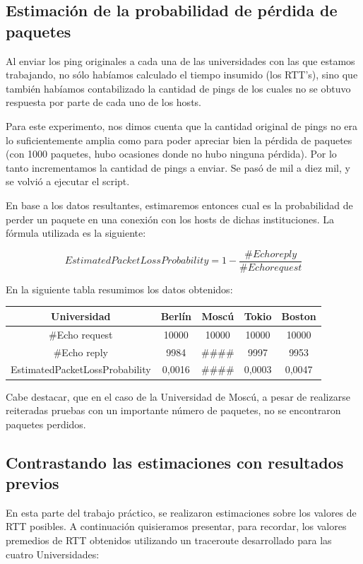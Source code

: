 \subsection{Estimación de la probabilidad de pérdida de paquetes}

Al enviar los ping originales a cada una de las universidades con las que estamos trabajando, no sólo habíamos calculado el tiempo insumido (los RTT's), sino que también habíamos contabilizado la cantidad de pings de los cuales no se obtuvo respuesta por parte de cada uno de los hosts. 

Para este experimento, nos dimos cuenta que la cantidad original de pings no era lo suficientemente amplia como para poder apreciar bien la pérdida de paquetes (con 1000 paquetes, hubo ocasiones donde no hubo ninguna pérdida). Por lo tanto incrementamos la cantidad de pings a enviar. Se pasó de mil a diez mil, y se volvió a ejecutar el script.

En base a los datos resultantes, estimaremos entonces cual es la probabilidad de perder un paquete en una conexión con los hosts de dichas instituciones. La fórmula utilizada es la siguiente:

\begin{equation}
EstimatedPacketLossProbability = 1 - \frac{\#Echo reply}{\#Echo request}
\end{equation}

En la siguiente tabla resumimos los datos obtenidos:

\begin{center}
 \begin{tabular}{|c||c|c|c|c|}
    \hline
    Universidad & Berlín & Moscú & Tokio & Boston \\ \hline \hline
    \#Echo request & 10000 & 10000 & 10000 & 10000 \\ \hline
    \#Echo reply & 9984 & \#\#\#\# & 9997 & 9953 \\ \hline
    EstimatedPacketLossProbability & 0,0016 & \#\#\#\# & 0,0003 & 0,0047 \\ \hline
 \end{tabular}
\end{center}

Cabe destacar, que en el caso de la Universidad de Moscú, a pesar de realizarse reiteradas pruebas con un importante número de paquetes, no se encontraron paquetes perdidos. 

\subsection{Contrastando las estimaciones con resultados previos}
En esta parte del trabajo práctico, se realizaron estimaciones sobre los valores de RTT posibles. A continuación quisieramos presentar, para recordar, los valores premedios de RTT obtenidos utilizando un traceroute desarrollado para las cuatro Universidades: 

